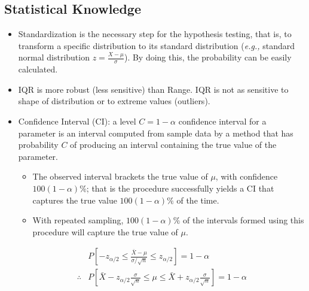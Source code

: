 \documentclass{article}
\begin{document}
\subsection{Statistical Knowledge}
\begin{itemize}
    \item Standardization is the necessary step for the hypothesis testing, that is, to transform a specific distribution to its standard distribution (\textit{e.g.,} standard normal distribution $z=\frac{X-\mu}{\sigma}$). By doing this, the probability can be easily calculated. 
    \item IQR is more robust (less sensitive) than Range. IQR is not as sensitive to shape of distribution or to extreme values (outliers).
    \item Confidence Interval (CI): a level $C=1-\alpha$ confidence interval for a parameter is an interval computed from sample data by a method that has probability $C$ of producing an interval containing the true value of the parameter.
        \begin{itemize}
            \item The observed interval brackets the true value of $\mu$, with confidence $100(1-\alpha)\%$; that is the procedure successfully yields a CI that captures the true value $100(1-\alpha)\%$ of the time. 
            \item With repeated sampling, $100(1-\alpha)\%$ of the intervals formed using this procedure will capture the true value of $\mu$.
        \end{itemize}
         \begin{align*}
                   &P[-z_{\alpha/2}\leq \frac{\bar{X}-\mu}{\sigma/\sqrt{n}}\leq z_{\alpha/2}]=1-\alpha \\
        \therefore &P[\bar{X}-z_{\alpha/2}\frac{\sigma}{\sqrt{n}}\leq \mu \leq \bar{X}+z_{\alpha/2}\frac{\sigma}{\sqrt{n}}]=1-\alpha
        \end{align*}
\end{itemize}

%
%
\end{document}

